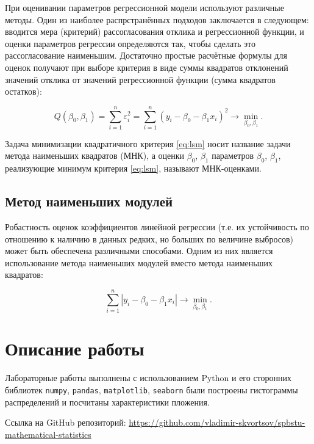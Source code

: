 \documentclass[12pt,a4paper]{article}
\begin{document}
	При оценивании параметров регрессионной модели используют различные
	методы. Один из наиболее распрстранённых подходов заключается в
	следующем: вводится мера (критерий) рассогласования отклика и
	регрессионной функции, и оценки параметров регрессии определяются так,
	чтобы сделать это рассогласование наименьшим. Достаточно простые
	расчётные формулы для оценок получают при выборе критерия в виде суммы
	квадратов отклонений значений отклика от значений регрессионной функции
	(сумма квадратов остатков):

	\begin{equation} \label{eq:lsm}
		Q(\beta_0, \beta_1) = \sum \limits_{i=1}^n \varepsilon_i^2 =
		\sum \limits_{i=1}^n (y_i - \beta_0 - \beta_1 x_i)^2 \rightarrow
		\min_{\beta_0, \beta_1}.
	\end{equation}

	Задача минимизации квадратичного критерия \eqref{eq:lsm} носит название
	задачи метода наименьших квадратов (МНК), а оценки \( \beta_0 \),
	\( \beta_1 \) параметров \( \beta_0 \), \( \beta_1 \), реализующие минимум
	критерия \eqref{eq:lsm}, называют МНК-оценками.

	\subsection{Метод наименьших модулей}

	Робастность оценок коэффициентов линейной регрессии (т.е. их
	устойчивость по отношению к наличию в данных редких, но больших по
	величине выбросов) может быть обеспечена различными способами. Одним из
	них является использование метода наименьших модулей вместо метода
	наименьших квадратов:

	\begin{equation} \label{eq:lam}
		\sum \limits_{i=1}^n |y_i - \beta_0 - \beta_1 x_i| \rightarrow
		\min_{\beta_0, \beta_1}.
	\end{equation}


	\section{Описание работы}
	Лабораторные работы выполнены с использованием Python и его сторонних
	библиотек \verb!numpy!, \verb!pandas!, \verb!matplotlib!, \verb!seaborn! были
	построены гистограммы распределений и посчитаны характеристики пложения.

	Ссылка на GitHub репозиторий:
	\href{https://github.com/vladimir-skvortsov/spbstu-mathematical-statistics}
	{https://github.com/vladimir-skvortsov/spbstu-mathematical-statistics}
\end{document}

